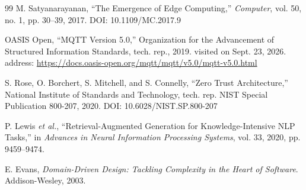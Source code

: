 \begin{thebibliography}{99}
 M. Satyanarayanan, ``The Emergence of Edge Computing,'' \textit{Computer},
vol. 50, no. 1, pp. 30--39, 2017. DOI: 10.1109/MC.2017.9

 OASIS Open, ``MQTT Version 5.0,'' Organization for the Advancement of
Structured Information Standards, tech. rep., 2019. visited on Sept. 23, 2026.
address: \url{https://docs.oasis-open.org/mqtt/mqtt/v5.0/mqtt-v5.0.html}

 S. Rose, O. Borchert, S. Mitchell, and S. Connelly, ``Zero Trust
Architecture,'' National Institute of Standards and Technology, tech. rep.
NIST Special Publication 800-207, 2020. DOI: 10.6028/NIST.SP.800-207

 P. Lewis \textit{et al.}, ``Retrieval-Augmented Generation for
Knowledge-Intensive NLP Tasks,'' in \textit{Advances in Neural Information
Processing Systems}, vol. 33, 2020, pp. 9459--9474.

 E. Evans, \textit{Domain-Driven Design: Tackling Complexity
in the Heart of Software}. Addison-Wesley, 2003.
\end{thebibliography}
